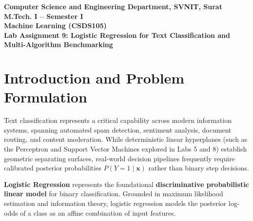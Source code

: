 \documentclass[12pt]{article}
\begin{document}

\begin{center}
\textbf{Computer Science and Engineering Department, SVNIT, Surat}\\
\textbf{M.Tech. I -- Semester I}\\
\textbf{Machine Learning (CSDS105)}\\
\textbf{Lab Assignment 9: Logistic Regression for Text Classification and Multi-Algorithm Benchmarking}
\end{center}

\vspace{0.3cm}

\section{Introduction and Problem Formulation}

Text classification represents a critical capability across modern information systems, spanning automated spam detection, sentiment analysis, document routing, and content moderation. While deterministic linear hyperplanes (such as the Perceptron and Support Vector Machines explored in Labs 5 and 8) establish geometric separating surfaces, real-world decision pipelines frequently require calibrated posterior probabilities $P(Y = 1 \mid \mathbf{x})$ rather than binary step decisions.

\textbf{Logistic Regression} represents the foundational \textbf{discriminative probabilistic linear model} for binary classification. Grounded in maximum likelihood estimation and information theory, logistic regression models the posterior log-odds of a class as an affine combination of input features.
\end{document}
